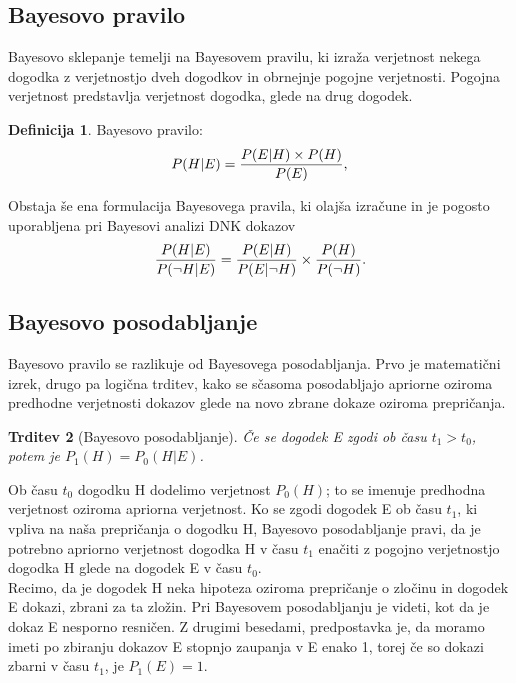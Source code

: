 \documentclass[12pt,a4paper]{amsart}
\theoremstyle{definition} %
\newtheorem{definicija}{Definicija}[section]
\theoremstyle{plain} %
\newtheorem{trditev}[definicija]{Trditev}
\begin{document}
\subsection{Bayesovo pravilo}
Bayesovo sklepanje temelji na Bayesovem pravilu, ki izraža verjetnost nekega dogodka z verjetnostjo dveh dogodkov in obrnejnje pogojne
verjetnosti. Pogojna verjetnost predstavlja verjetnost dogodka, glede na drug dogodek.\\
\begin{definicija}
    Bayesovo pravilo:
    \[
        P(H \lvert E) = \frac{P(E \lvert H) \times P(H)}{P(E)}, \vspace{2mm}
    \] 
\end{definicija} \vspace{3mm}
Obstaja še ena formulacija Bayesovega pravila, ki olajša izračune in je pogosto uporabljena pri Bayesovi analizi DNK dokazov
\[
    \frac{P(H \lvert E)}{P(\neg H \lvert E)} = \frac{P(E \lvert H)}{P(E \lvert \neg H)} \times \frac{P(H)}{P(\neg H)}. \vspace{2mm}
\]

\subsection{Bayesovo posodabljanje}
Bayesovo pravilo se razlikuje od Bayesovega posodabljanja. Prvo je matematični izrek, drugo pa logična trditev, kako se sčasoma posodabljajo
apriorne oziroma predhodne verjetnosti dokazov glede na novo zbrane dokaze oziroma prepričanja.
\begin{trditev}[Bayesovo posodabljanje]
    Če se dogodek E zgodi ob času $t_1 > t_0$, potem je $P_1(H) = P_0(H \lvert E)$.
\end{trditev}
Ob času $t_0$ dogodku H dodelimo verjetnost $P_0(H)$; to se imenuje predhodna verjetnost oziroma apriorna verjetnost. Ko se zgodi dogodek E
ob času $t_1$, ki vpliva na naša prepričanja o dogodku H, Bayesovo posodabljanje pravi, da je potrebno apriorno verjetnost dogodka H v času $t_1$
enačiti z pogojno verjetnostjo dogodka H glede na dogodek E v času $t_0$. \\
Recimo, da je dogodek H neka hipoteza oziroma prepričanje o zločinu in dogodek E dokazi, zbrani za ta zložin. Pri Bayesovem posodabljanju je videti,
kot da je dokaz E nesporno resničen. Z drugimi besedami, predpostavka je, da moramo imeti po zbiranju dokazov E stopnjo zaupanja v E enako 1,
torej če so dokazi zbarni v času $t_1$, je $P_1(E)=1$.
\end{document}
